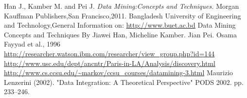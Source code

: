 \documentclass[
12pt, %
oneside, %
english, %
doublespacing, %
headsepline, %
]{MastersDoctoralThesis} %
\begin{document}
\hypersetup{linkcolor=black}{
	\tableofcontents %
}
\listoffigures %

\listoftables %


\mainmatter %

\pagestyle{thesis} %



 

 
 
 


\appendix %








\begin{thebibliography}{2}
Han J., Kamber M. and Pei J. \textit{Data Mining:Concepts and Techniques.} Morgan Kauffman Publishers,San Francisco,2011.
Bangladesh University of Engineering and Technology,General Information on:
\url{http://www.buet.ac.bd} 
Data Mining Concepts and Techniques By Jiawei Han, Micheline Kamber. Jian Pei.
Osama Fayyad et al., 1996
\url{http://researcher.watson.ibm.com/researcher/view_group.php?id=144}
\url{http://www.usc.edu/dept/ancntr/Paris-in-LA/Analysis/discovery.html}
\url{http://www.cs.ccsu.edu/~markov/ccsu_courses/datamining-3.html}
Maurizio Lenzerini (2002). "Data Integration: A Theoretical Perspective" PODS 2002. pp. 233–246.
\end{thebibliography} 


\end{document}
